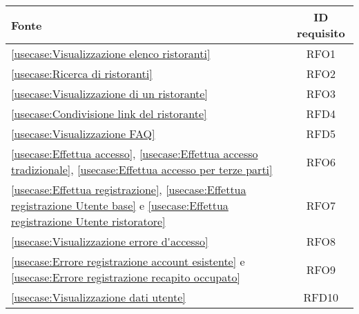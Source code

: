 \begin{longtable}{|l|c|}
	\hline
	\textbf{Fonte}                                                                                                                                               & \textbf{ ID requisito} \\
	\hline
	\autoref{usecase:Visualizzazione elenco ristoranti}                                                                                                          & RFO1                   \\
	\hline
	\autoref{usecase:Ricerca di ristoranti}                                                                                                                      & RFO2                   \\
	\hline
	\autoref{usecase:Visualizzazione di un ristorante}                                                                                                           & RFO3                   \\
	\hline
	\autoref{usecase:Condivisione link del ristorante}                                                                                                           & RFD4                   \\
	\hline
	\autoref{usecase:Visualizzazione FAQ}                                                                                                                        & RFD5                   \\
	\hline
	\autoref{usecase:Effettua accesso}, \autoref{usecase:Effettua accesso tradizionale}, \autoref{usecase:Effettua accesso per terze parti}                      & RFO6                   \\
	\hline
	\autoref{usecase:Effettua registrazione}, \autoref{usecase:Effettua registrazione Utente base} e \autoref{usecase:Effettua registrazione Utente ristoratore} & RFO7                   \\
	\hline
	\autoref{usecase:Visualizzazione errore d'accesso}                                                                                                           & RFO8                   \\
	\hline
	\autoref{usecase:Errore registrazione account esistente} e \autoref{usecase:Errore registrazione recapito occupato}                                          & RFO9                   \\
	\hline
	\autoref{usecase:Visualizzazione dati utente}                                                                                                                & RFD10                  \\

\end{longtable}
